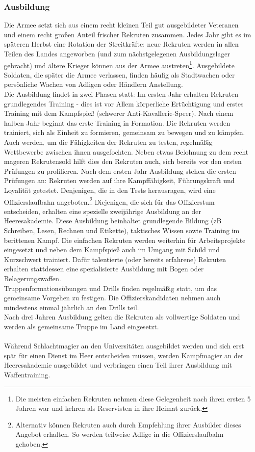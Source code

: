 \subsubsection{Ausbildung}
Die Armee setzt sich aus einem recht kleinen Teil gut ausgebildeter Veteranen und einem recht großen Anteil frischer Rekruten zusammen. 
Jedes Jahr gibt es im späteren Herbst eine Rotation der Streitkräfte: neue Rekruten werden in allen Teilen des Landes angeworben 
(und zum nächstgelegenen Ausbildungslager gebracht) und ältere Krieger können aus der Armee austreten\footnote{Die meisten einfachen Rekruten 
nehmen diese Gelegenheit nach ihren ersten 5 Jahren war und kehren als Reservisten in ihre Heimat zurück.}. Ausgebildete Soldaten, die später die Armee verlassen, 
finden häufig als Stadtwachen oder persönliche Wachen von Adligen oder Händlern Anstellung.\\
Die Ausbildung findet in zwei Phasen statt: Im ersten Jahr erhalten Rekruten grundlegendes Training - dies ist vor Allem körperliche 
Ertüchtigung und erstes Training mit dem Kampfspieß (schwerer Anti-Kavallerie-Speer). 
Nach einem halben Jahr beginnt das erste Training in Formation. Die Rekruten werden trainiert, sich als Einheit zu formieren, gemeinsam zu bewegen und zu kämpfen. 
Auch werden, um die Fähigkeiten der Rekruten zu testen, regelmäßig Wettbewerbe zwischen ihnen ausgefochten. 
Neben etwas Belohnung zu dem recht mageren Rekrutensold hilft dies den Rekruten auch, sich bereits vor den ersten Prüfungen zu profilieren.
Nach dem ersten Jahr Ausbildung stehen die ersten Prüfungen an: Rekruten werden auf ihre Kampffähigkeit, Führungskraft und Loyalität getestet. 
Denjenigen, die in den Tests herausragen, wird eine Offizierslaufbahn angeboten.\footnote{Alternativ können Rekruten auch durch Empfehlung ihrer Ausbilder dieses Angebot erhalten. So werden teilweise Adlige in die Offizierslaufbahn gehoben.} 
Diejenigen, die sich für das Offizierstum entscheiden, erhalten eine spezielle zweijährige Ausbildung an der Heeresakademie. 
Diese Ausbildung beinhaltet grundlegende Bildung (zB Schreiben, Lesen, Rechnen und Etikette), taktisches Wissen sowie Training im berittenen Kampf. 
Die einfachen Rekruten werden weiterhin für Arbeitsprojekte eingesetzt und neben dem Kampfspieß auch im Umgang mit Schild und Kurzschwert trainiert. 
Dafür talentierte (oder bereits erfahrene) Rekruten erhalten stattdessen eine spezialisierte Ausbildung mit Bogen oder Belagerungswaffen.\\
Truppenformationsübungen und Drills finden regelmäßig statt, um das gemeinsame Vorgehen zu festigen. 
Die Offizierskandidaten nehmen auch mindestens einmal jährlich an den Drills teil. \\
Nach drei Jahren Ausbildung gelten die Rekruten als vollwertige Soldaten und werden als gemeinsame Truppe im Land eingesetzt.\\~\\
Während Schlachtmagier an den Universitäten ausgebildet werden und sich erst spät für einen Dienst im Heer entscheiden müssen, werden Kampfmagier an der Heeresakademie ausgebildet 
und verbringen einen Teil ihrer Ausbildung mit Waffentraining.

